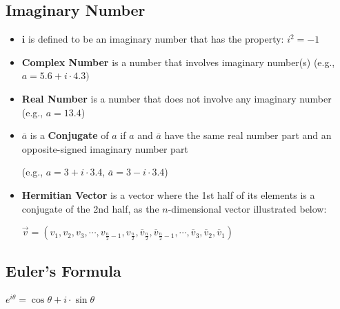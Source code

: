 \subsection{Imaginary Number}
\label{subsec:imaginary}


\begin{tcolorbox}[title={\textbf{\tboxdef{\ref*{subsec:imaginary}} Imaginary Number}}]

\begin{itemize}

\item $\bm{i}$ is defined to be an imaginary number that has the property: $i^2 =-1$
\item \textbf{Complex Number} is a number that involves imaginary number(s) (e.g., $a = 5.6 + i\cdot4.3)$

\item \textbf{Real Number} is a number that does not involve any imaginary number (e.g., $a = 13.4$)

\item $\overline{a}$ is a \textbf{Conjugate} of $a$ if $a$ and $\overline{a}$ have the same real number part and an opposite-signed imaginary number part

(e.g., $a = 3 + i\cdot3.4$, \text{ } $\overline{a} = 3 - i\cdot3.4$)

\item \textbf{Hermitian Vector} is a vector where the 1st half of its elements is a conjugate of the 2nd half, as the $n$-dimensional vector illustrated below:

$\vec{v} = (v_1, v_2, v_3, \cdots, v_{\frac{n}{2}-1}, v_{\frac{n}{2}}, \overline{v}_{\frac{n}{2}}, \overline{v}_{\frac{n}{2} - 1}, \cdots, \overline{v}_3, \overline{v}_2, \overline{v}_1)$


\end{itemize}
\end{tcolorbox}



\subsection{Euler's Formula}
\label{subsec:euler}




\begin{tcolorbox}[title={\textbf{\tboxdef{\ref*{subsec:euler}} Euler's Formula}}]

$e^{i\theta} = \cos\theta + i\cdot\sin\theta$

\end{tcolorbox}

